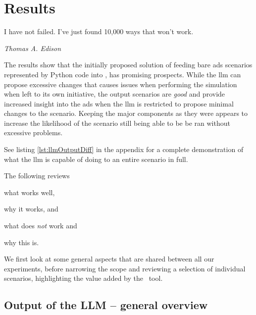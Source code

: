 \chapter{Results}\label{chp:results}

\epigraph{I have not failed. I've just found 10,000 ways that won't work.}{\textit{Thomas A.
        Edison}}

The results show that the initially proposed solution of feeding bare
\acrshort{ads} scenarios represented by Python code into , has promising prospects.
While the \acrshort{llm} can propose excessive changes that causes issues when performing the
simulation when left to its own initiative, the output scenarios are \emph{good} and provide
increased insight into the \acrshort{ads} when the \acrshort{llm} is restricted to propose minimal
changes to the scenario. Keeping the major components as they were appears to increase the
likelihood of the scenario still being able to be be ran without excessive problems.

See listing \ref{lst:llmOutputDiff} in the  appendix for a complete
demonstration of what the \acrlong{llm} is capable of doing to an entire scenario in full.

The following reviews \begin{inparaenum}
    \item what works well,
    \item why it works, and
    \item what does \emph{not} work and
    \item why this is.
\end{inparaenum} We first look at some general aspects that are shared between all our experiments, before narrowing
the scope and reviewing a selection of individual scenarios, highlighting the value added by the
\hefe~tool.



\section{Output of the LLM -- general overview}

